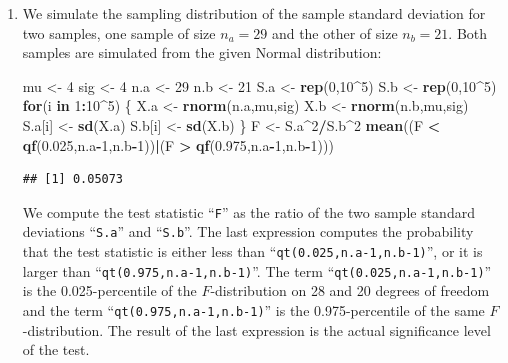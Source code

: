 \documentclass[]{krantz}
\makeatletter
\newenvironment{Shaded}{\begin{snugshade}}{\end{snugshade}}
\newcommand{\KeywordTok}[1]{\textcolor[rgb]{0.13,0.29,0.53}{\textbf{#1}}}
\newcommand{\DecValTok}[1]{\textcolor[rgb]{0.00,0.00,0.81}{#1}}
\newcommand{\FloatTok}[1]{\textcolor[rgb]{0.00,0.00,0.81}{#1}}
\newcommand{\StringTok}[1]{\textcolor[rgb]{0.31,0.60,0.02}{#1}}
\newcommand{\ControlFlowTok}[1]{\textcolor[rgb]{0.13,0.29,0.53}{\textbf{#1}}}
\newcommand{\OperatorTok}[1]{\textcolor[rgb]{0.81,0.36,0.00}{\textbf{#1}}}
\newcommand{\NormalTok}[1]{#1}
\newenvironment{kframe}{%
\medskip{}
\setlength{\fboxsep}{.8em}
 \def\at@end@of@kframe{}%
 \ifinner\ifhmode%
  \def\at@end@of@kframe{\end{minipage}}%
  \begin{minipage}{\columnwidth}%
 \fi\fi%
 \def\FrameCommand##1{\hskip\@totalleftmargin \hskip-\fboxsep
 \colorbox{shadecolor}{##1}\hskip-\fboxsep
     \hskip-\linewidth \hskip-\@totalleftmargin \hskip\columnwidth}%
 \MakeFramed {\advance\hsize-\width
   \@totalleftmargin\z@ \linewidth\hsize
   \@setminipage}}%
 {\par\unskip\endMakeFramed%
 \at@end@of@kframe}
\renewenvironment{Shaded}{\begin{kframe}}{\end{kframe}}
\theoremstyle{definition}
\theoremstyle{definition}
\theoremstyle{definition}
\theoremstyle{remark}
\makeatother
\begin{document}
\begin{enumerate}
\def\labelenumi{\arabic{enumi}.}
\item
  We simulate the sampling distribution of the sample standard deviation
  for two samples, one sample of size \(n_a = 29\) and the other of size
  \(n_b=21\). Both samples are simulated from the given Normal
  distribution:

\begin{Shaded}
\begin{Highlighting}[]
\NormalTok{mu <-}\StringTok{ }\DecValTok{4}
\NormalTok{sig <-}\StringTok{ }\DecValTok{4}
\NormalTok{n.a <-}\StringTok{ }\DecValTok{29}
\NormalTok{n.b <-}\StringTok{ }\DecValTok{21}
\NormalTok{S.a <-}\StringTok{ }\KeywordTok{rep}\NormalTok{(}\DecValTok{0}\NormalTok{,}\DecValTok{10}\OperatorTok{^}\DecValTok{5}\NormalTok{)}
\NormalTok{S.b <-}\StringTok{ }\KeywordTok{rep}\NormalTok{(}\DecValTok{0}\NormalTok{,}\DecValTok{10}\OperatorTok{^}\DecValTok{5}\NormalTok{)}
\ControlFlowTok{for}\NormalTok{(i }\ControlFlowTok{in} \DecValTok{1}\OperatorTok{:}\DecValTok{10}\OperatorTok{^}\DecValTok{5}\NormalTok{) \{}
\NormalTok{  X.a <-}\StringTok{ }\KeywordTok{rnorm}\NormalTok{(n.a,mu,sig)}
\NormalTok{  X.b <-}\StringTok{ }\KeywordTok{rnorm}\NormalTok{(n.b,mu,sig)}
\NormalTok{  S.a[i] <-}\StringTok{ }\KeywordTok{sd}\NormalTok{(X.a)}
\NormalTok{  S.b[i] <-}\StringTok{ }\KeywordTok{sd}\NormalTok{(X.b)}
\NormalTok{\}}
\NormalTok{F <-}\StringTok{ }\NormalTok{S.a}\OperatorTok{^}\DecValTok{2}\OperatorTok{/}\NormalTok{S.b}\OperatorTok{^}\DecValTok{2}
\KeywordTok{mean}\NormalTok{((F }\OperatorTok{<}\StringTok{ }\KeywordTok{qf}\NormalTok{(}\FloatTok{0.025}\NormalTok{,n.a}\OperatorTok{-}\DecValTok{1}\NormalTok{,n.b}\OperatorTok{-}\DecValTok{1}\NormalTok{))}\OperatorTok{|}\NormalTok{(F }\OperatorTok{>}\StringTok{ }\KeywordTok{qf}\NormalTok{(}\FloatTok{0.975}\NormalTok{,n.a}\OperatorTok{-}\DecValTok{1}\NormalTok{,n.b}\OperatorTok{-}\DecValTok{1}\NormalTok{)))}
\end{Highlighting}
\end{Shaded}

\begin{verbatim}
## [1] 0.05073
\end{verbatim}

  We compute the test statistic ``\texttt{F}'' as the ratio of the two
  sample standard deviations ``\texttt{S.a}'' and ``\texttt{S.b}''. The
  last expression computes the probability that the test statistic is
  either less than ``\texttt{qt(0.025,n.a-1,n.b-1)}'', or it is larger
  than ``\texttt{qt(0.975,n.a-1,n.b-1)}''. The term
  ``\texttt{qt(0.025,n.a-1,n.b-1)}'' is the 0.025-percentile of the
  \(F\)-distribution on 28 and 20 degrees of freedom and the term
  ``\texttt{qt(0.975,n.a-1,n.b-1)}'' is the 0.975-percentile of the same
  \(F\)-distribution. The result of the last expression is the actual
  significance level of the test.


\end{enumerate}
\end{document}
